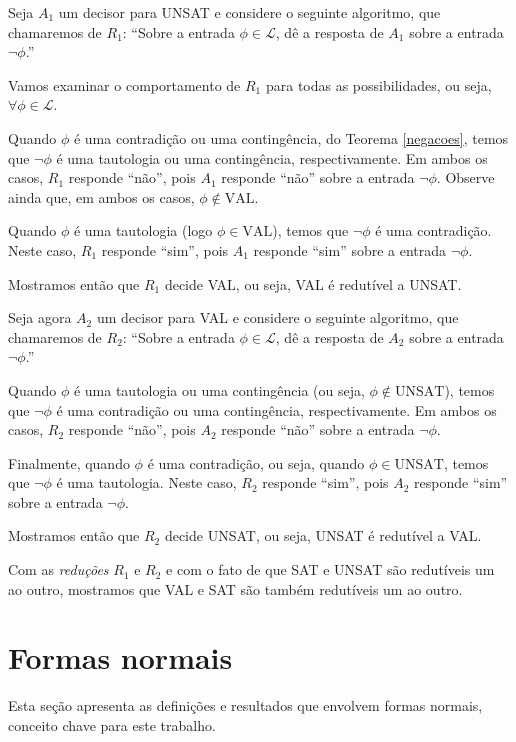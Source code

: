 \begin{prova}
Seja $A_1$ um decisor para UNSAT e considere o seguinte algoritmo, que chamaremos de $R_1$: ``Sobre a entrada $\phi \in \mathcal{L}$, dê a resposta de $A_1$ sobre a entrada $\neg \phi$.''

Vamos examinar o comportamento de $R_1$ para todas as possibilidades, ou seja, $\forall \phi \in \mathcal{L}$.

Quando $\phi$ é uma contradição ou uma contingência, do Teorema \ref{negacoes}, temos que $\neg \phi$ é uma tautologia ou uma contingência, respectivamente. Em ambos os casos, $R_1$ responde ``não'', pois $A_1$ responde ``não'' sobre a entrada $\neg \phi$. Observe ainda que, em ambos os casos, $\phi \notin \text{VAL}$.

Quando $\phi$ é uma tautologia (logo $\phi \in \text{VAL}$), temos que $\neg \phi$ é uma contradição. Neste caso, $R_1$ responde ``sim'', pois $A_1$ responde ``sim'' sobre a entrada $\neg \phi$.

Mostramos então que $R_1$ decide VAL, ou seja, VAL é redutível a UNSAT.

Seja agora $A_2$ um decisor para VAL e considere o seguinte algoritmo, que chamaremos de $R_2$: ``Sobre a entrada $\phi \in \mathcal{L}$, dê a resposta de $A_2$ sobre a entrada $\neg \phi$.''

Quando $\phi$ é uma tautologia ou uma contingência (ou seja, $\phi \notin \text{UNSAT}$), temos que $\neg \phi$ é uma contradição ou uma contingência, respectivamente. Em ambos os casos, $R_2$ responde ``não'', pois $A_2$ responde ``não'' sobre a entrada $\neg \phi$.

Finalmente, quando $\phi$ é uma contradição, ou seja, quando $\phi \in \text{UNSAT}$, temos que $\neg \phi$ é uma tautologia. Neste caso, $R_2$ responde ``sim'', pois $A_2$ responde ``sim'' sobre a entrada $\neg \phi$.

Mostramos então que $R_2$ decide UNSAT, ou seja, UNSAT é redutível a VAL.

Com as \emph{reduções} $R_1$ e $R_2$ e com o fato de que SAT e UNSAT são redutíveis um ao outro, mostramos que VAL e SAT são também redutíveis um ao outro.
\end{prova}

\section{Formas normais}

\indent

Esta seção apresenta as definições e resultados que envolvem formas normais, conceito chave para este trabalho.

